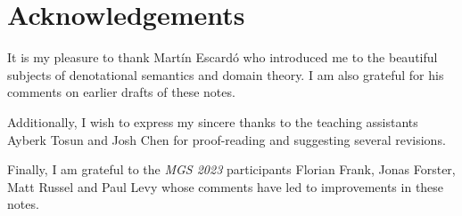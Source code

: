 \chapter{Acknowledgements}

It is my pleasure to thank Mart\'in Escard\'o who introduced me to the beautiful
subjects of denotational semantics and domain theory. I am also grateful for his
comments on earlier drafts of these notes.

Additionally, I wish to express my sincere thanks to the teaching assistants
Ayberk Tosun and Josh Chen for proof-reading and suggesting several
revisions.

Finally, I am grateful to the \emph{MGS 2023} participants Florian Frank, Jonas
Forster, Matt Russel and Paul Levy whose comments have led to improvements in
these notes.


